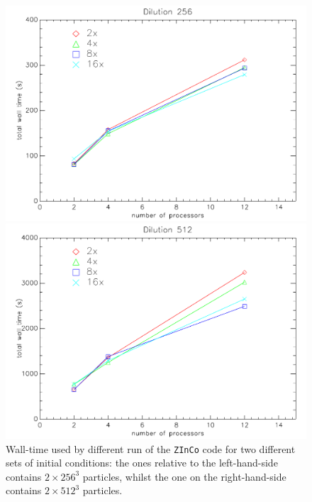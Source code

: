 \documentclass[11pt,a4paper,titlepage]{article}
\newcommand{\zinco}{\texttt{ZInCo}\xspace}
\begin{document}
\begin{figure}[!tb]
\begin{minipage}{0.45\textwidth}
\includegraphics[width=\textwidth]{benchmark_wtaVSnp_256_zoom.pdf}
\end{minipage}
\begin{minipage}{0.45\textwidth}
\begin{flushright}
\includegraphics[width=\textwidth]{benchmark_wtaVSnp_512_zoom.pdf}
\end{flushright}
\end{minipage}
\caption{Wall-time used by different run of the \zinco code for two different sets of initial conditions: the ones relative to the left-hand-side contains $2 \times 256^3$ particles, whilst the one on the right-hand-side contains $2 \times 512^3$ particles.}
\label{benchmark_wtaVSnp_zoom}
\end{figure}
\end{document}
